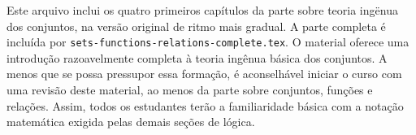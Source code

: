 \documentclass[../../include/open-logic-part]{subfiles}
\begin{document}

\begin{editorial}
  Este arquivo inclui os quatro primeiros capítulos da parte sobre teoria
  ing\"enua dos conjuntos, na versão original de ritmo mais gradual. A parte
  completa é incluída por \verb|sets-functions-relations-complete.tex|.
  O material oferece uma introdução razoavelmente completa à teoria ingênua
  básica dos conjuntos. A menos que se possa pressupor essa formação, é
  aconselhável iniciar o curso com uma revisão deste material, ao menos da
  parte sobre conjuntos, funções e relações. Assim, todos os estudantes terão
  a familiaridade básica com a notação matemática exigida pelas demais seções
  de lógica.
\end{editorial}





\OLEndPartHook
\end{document}
